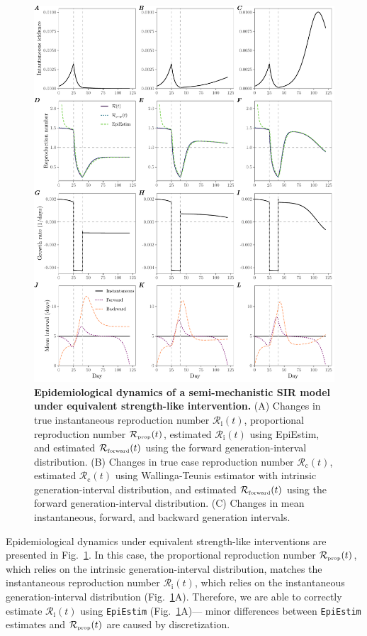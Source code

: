 \documentclass[12pt]{article}
\newcommand{\fref}[1]{Fig.~\ref{fig:#1}}
\newcommand{\Rx}[1]{\ensuremath{{\mathcal R}_{#1}}\xspace}
\newcommand{\Rc}{\Rx{\mathrm{c}}}
\newcommand{\Ri}{\Rx{\mathrm{i}}}
\newcommand{\RR}{\ensuremath{{\mathcal R}}\xspace}
\newcommand{\tsub}[2]{#1_{{\textrm{\tiny #2}}}}
\begin{document}
\begin{figure}[!th]
\includegraphics[width=\textwidth]{figure_sir_beta.pdf}
\caption{
\textbf{Epidemiological dynamics of a semi-mechanistic SIR model under equivalent strength-like intervention.}
(A) Changes in true instantaneous reproduction number $\Ri(t)$, proportional reproduction number $\tsub{\RR}{prop}(t)$, estimated $\Ri(t)$ using EpiEstim, and estimated $\tsub{\RR}{forward}(t)$ using the forward generation-interval distribution.
(B) Changes in true case reproduction number $\Rc(t)$, estimated $\Rc(t)$ using Wallinga-Teunis estimator with intrinsic generation-interval distribution, and estimated $\tsub{\RR}{forward}(t)$ using the forward generation-interval distribution.
(C) Changes in mean instantaneous, forward, and backward generation intervals.
}
\label{fig:sir_beta}
\end{figure}

Epidemiological dynamics under equivalent strength-like interventions are presented in \fref{sir_beta}.
In this case, the proportional reproduction number $\tsub{\RR}{prop}(t)$, which relies on the intrinsic generation-interval distribution, matches the instantaneous reproduction number $\Ri(t)$, which relies on the instantaneous generation-interval distribution (\fref{sir_beta}A).
Therefore, we are able to correctly estimate $\Ri(t)$ using \texttt{EpiEstim} (\fref{sir_beta}A)---
minor differences between \texttt{EpiEstim} estimates and $\tsub{\RR}{prop}(t)$ are caused by discretization.
\end{document}
